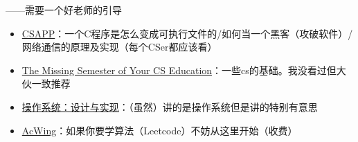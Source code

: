 \documentclass{ctexbeamer} %
\begin{document}
\begin{frame}
	\begin{flushright}
		——需要一个好老师的引导
	\end{flushright}
	\begin{itemize}
		\item \href{https://www.bilibili.com/video/BV1iW411d7hd/}{CSAPP}：一个C程序是怎么变成可执行文件的/如何当一个黑客（攻破软件）/网络通信的原理及实现（每个CSer都应该看）
		\item \href{https://www.bilibili.com/video/BV1x7411H7wa/}{The Missing Semester of Your CS Education}：一些cs的基础。我没看过但大伙一致推荐
		\item \href{https://space.bilibili.com/202224425/channel/collectiondetail?sid=192498}{操作系统：设计与实现}：（虽然）讲的是操作系统但是讲的特别有意思
		\item \href{https://www.acwing.com/}{AcWing}：如果你要学算法（Leetcode）不妨从这里开始（收费）
	\end{itemize}
\end{frame}

{
}

\end{document}
